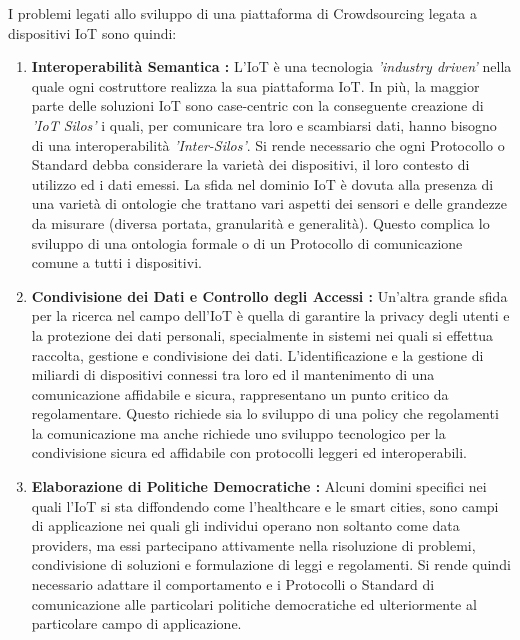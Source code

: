 I problemi legati allo sviluppo di una piattaforma di Crowdsourcing legata a dispositivi IoT sono quindi:
\begin{enumerate}
	\item \textbf{Interoperabilità Semantica :} L'IoT è una tecnologia \textit{'industry driven'} nella quale ogni costruttore realizza la sua piattaforma IoT. In più, la maggior parte delle soluzioni IoT sono case-centric con la conseguente creazione di \textit{'IoT Silos'} i quali, per comunicare tra loro e scambiarsi dati, hanno bisogno di una interoperabilità \textit{'Inter-Silos'}. Si rende necessario che ogni Protocollo o Standard debba considerare la varietà dei dispositivi, il loro contesto di utilizzo ed i dati emessi. La sfida nel dominio IoT è dovuta alla presenza di una varietà di ontologie che trattano vari aspetti dei sensori e delle grandezze da misurare (diversa portata, granularità e generalità). Questo complica lo sviluppo di una ontologia formale o di un Protocollo di comunicazione comune a tutti i dispositivi.
	\item \textbf{Condivisione dei Dati e Controllo degli Accessi :} Un'altra grande sfida per la ricerca nel campo dell'IoT è quella di garantire la privacy degli utenti e la protezione dei dati personali, specialmente in sistemi nei quali si effettua raccolta, gestione e condivisione dei dati. L'identificazione e la gestione di miliardi di dispositivi connessi tra loro ed il mantenimento di una comunicazione affidabile e sicura, rappresentano un punto critico da regolamentare.
	Questo richiede sia lo sviluppo di una policy che regolamenti la comunicazione ma anche richiede uno sviluppo tecnologico per la condivisione sicura ed affidabile con protocolli leggeri ed interoperabili.
	\item \textbf{Elaborazione di Politiche Democratiche :} Alcuni domini specifici nei quali l'IoT si sta diffondendo come l'healthcare e le smart cities, sono campi di applicazione nei quali gli individui operano non soltanto come data providers, ma essi partecipano attivamente nella risoluzione di problemi, condivisione di soluzioni e formulazione di leggi e regolamenti. Si rende quindi necessario adattare il comportamento e i Protocolli o Standard di comunicazione alle particolari politiche democratiche ed ulteriormente al particolare campo di applicazione.
\end{enumerate}






